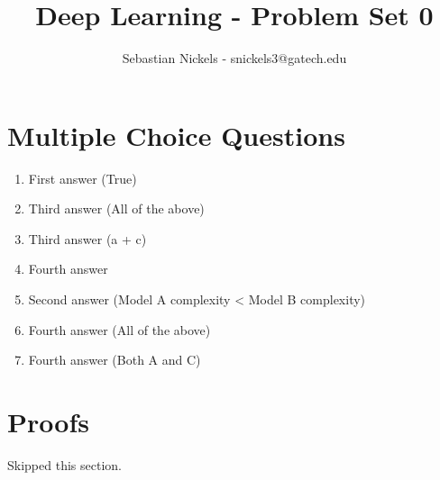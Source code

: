 \documentclass[11pt]{article}
\title{Deep Learning - Problem Set 0}
\author{Sebastian Nickels - snickels3@gatech.edu}
\begin{document}
\maketitle

\section{Multiple Choice Questions}
\begin{enumerate}
    \item First answer (True)
    \item Third answer (All of the above)
    \item Third answer (a + c)
    \item Fourth answer
    \item Second answer (Model A complexity < Model B complexity)
    \item Fourth answer (All of the above)
    \item Fourth answer (Both A and C)
\end{enumerate}

\section{Proofs}

Skipped this section.
\end{document}
